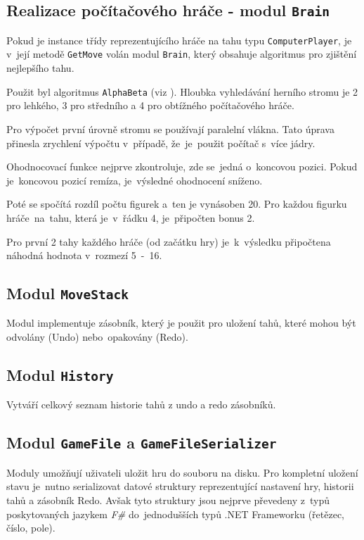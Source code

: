 \documentclass[12pt]{article}
\begin{document}
\subsection{Realizace počítačového hráče - modul \texttt{Brain}}
Pokud je instance třídy reprezentujícího hráče na tahu typu \texttt{ComputerPlayer}, je v~její metodě \texttt{GetMove} volán modul \texttt{Brain}, který obsahuje algoritmus pro zjištění nejlepšího tahu.

Použit byl algoritmus \texttt{AlphaBeta} (viz \cite{abwiki}). Hloubka vyhledávání herního stromu je 2 pro lehkého, 3 pro středního a 4 pro obtížného počítačového hráče.

Pro výpočet první úrovně stromu se používají paralelní vlákna. Tato úprava přinesla zrychlení výpočtu v~případě, že~je~použit počítač s~více jádry.

Ohodnocovací funkce nejprve zkontroluje, zde se~jedná o~koncovou pozici. Pokud je~koncovou pozicí remíza, je~výsledné ohodnocení sníženo.

Poté se spočítá rozdíl počtu figurek a~ten je vynásoben 20. Pro každou figurku hráče~na~tahu, která je~v~řádku 4, je~připočten bonus 2.

Pro první 2 tahy každého hráče (od začátku hry) je~k~výsledku připočtena náhodná hodnota v~rozmezí 5~-~16.

\subsection{Modul \texttt{MoveStack}}
Modul implementuje zásobník, který je použit pro uložení tahů, které mohou být odvolány (Undo) nebo~opakovány (Redo).

\subsection{Modul \texttt{History}}
Vytváří celkový seznam historie tahů z undo a redo zásobníků.

\subsection{Modul \texttt{GameFile} a \texttt{GameFileSerializer}}
Moduly umožňují uživateli uložit hru do souboru na disku. Pro kompletní uložení stavu je~nutno serializovat datové struktury reprezentující nastavení hry, historii tahů a zásobník Redo. Avšak tyto struktury jsou nejprve převedeny z~typů poskytovaných jazykem \emph{F\#} do~jednodušších typů .NET Frameworku (řetězec, číslo, pole).
\end{document}
